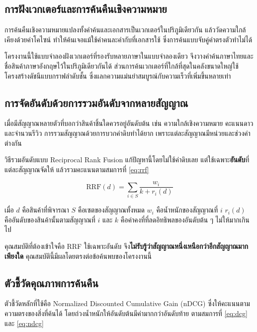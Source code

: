 \subsection{การฝังเวกเตอร์และการค้นคืนเชิงความหมาย}

การค้นคืนเชิงความหมายแปลงทั้งคำค้นและเอกสารเป็นเวกเตอร์ในปริภูมิเดียวกัน แล้ววัดความใกล้เคียงด้วยค่าโคไซน์ ทำให้ค้นเจอแม้ใช้คำคนละคำกับที่เอกสารใช้ ซึ่งการค้นแบบจับคู่คำตรงตัวทำไม่ได้

โครงงานนี้ใช้แบบจำลองฝังเวกเตอร์ที่รองรับหลายภาษาในแบบจำลองเดียว \cite{chen2024bgem3} จึงวางคำค้นภาษาไทยและชื่อสินค้าภาษาอังกฤษไว้ในปริภูมิเดียวกันได้ ส่วนการค้นเวกเตอร์ที่ใกล้ที่สุดในคลังขนาดใหญ่ใช้โครงสร้างดัชนีแบบกราฟลำดับชั้น \cite{malkov2020hnsw} ซึ่งแลกความแม่นยำสมบูรณ์กับความเร็วที่เพิ่มขึ้นหลายเท่า

\subsection{การจัดอันดับด้วยการรวมอันดับจากหลายสัญญาณ}

เมื่อมีสัญญาณหลายตัวที่บอกว่าสินค้าชิ้นใดควรอยู่อันดับต้น เช่น ความใกล้เชิงความหมาย คะแนนดาว และจำนวนรีวิว การรวมสัญญาณด้วยการบวกค่าดิบทำได้ยาก เพราะแต่ละสัญญาณมีหน่วยและช่วงค่าต่างกัน

วิธีรวมอันดับแบบ Reciprocal Rank Fusion \cite{cormack2009rrf} แก้ปัญหานี้โดยไม่ใช้ค่าดิบเลย แต่ใช้เฉพาะ\textbf{อันดับ}ที่แต่ละสัญญาณจัดให้ แล้วรวมคะแนนตามสมการที่ \ref{eq:rrf}

\begin{equation}
\label{eq:rrf}
\mathrm{RRF}(d) = \sum_{i \in S} \frac{w_i}{k + r_i(d)}
\end{equation}

เมื่อ $d$ คือสินค้าที่พิจารณา $S$ คือเซตของสัญญาณทั้งหมด $w_i$ คือน้ำหนักของสัญญาณที่ $i$ $r_i(d)$ คืออันดับของสินค้านั้นตามสัญญาณที่ $i$ และ $k$ คือค่าคงที่ที่ลดอิทธิพลของอันดับต้น ๆ ไม่ให้มากเกินไป

คุณสมบัติที่ต้องเข้าใจคือ RRF ใช้เฉพาะอันดับ จึง\textbf{ไม่รับรู้ว่าสัญญาณหนึ่งเหนือกว่าอีกสัญญาณมากเพียงใด} คุณสมบัตินี้มีผลโดยตรงต่อข้อค้นพบของโครงงานนี้

\subsection{ตัวชี้วัดคุณภาพการค้นคืน}

ตัวชี้วัดหลักที่ใช้คือ Normalized Discounted Cumulative Gain (nDCG) \cite{jarvelin2002ndcg} ซึ่งให้คะแนนตามความตรงของสิ่งที่ค้นได้ โดยถ่วงน้ำหนักให้อันดับต้นมีค่ามากกว่าอันดับท้าย ตามสมการที่ \ref{eq:dcg} และ \ref{eq:ndcg}

